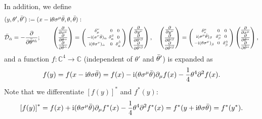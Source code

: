 \documentclass[CheatSheet]{subfiles}
\begin{document}
In addition, we define
\begin{align}
 & (y,\theta',\btheta'):=(x-\ii\theta\sigma^\mu\btheta,\theta,\btheta):
 \\&
\bar{\mathcal D}_\dalpha = -\pdiff{}{\btheta^{\prime\dalpha}};\qquad
 \left(\begin{matrix}\pdiff{}{x^\mu}\\\pdiff{}{\theta^\alpha}\\\pdiff{}{\btheta^\dalpha}\end{matrix}\right)
=\left(\begin{smallmatrix}\delta^\nu_\mu&0&0\\-\ii(\sigma^\nu\btheta)_\alpha&\delta^\beta_\alpha&0\\\ii(\theta\sigma^\nu)_\dalpha&0&\delta^\dbeta_\dalpha
       \end{smallmatrix}\right)
 \left(\begin{matrix}\pdiff{}{y^\nu}\\\pdiff{}{\theta^{\prime\beta}}\\\pdiff{}{\btheta^{\prime\dbeta}}\end{matrix}\right),\quad
 \left(\begin{matrix}\pdiff{}{y^\nu}\\\pdiff{}{\theta^{\prime\beta}}\\\pdiff{}{\btheta^{\prime\dbeta}}\end{matrix}\right)
=\left(\begin{smallmatrix}\delta^\mu_\nu&0&0\\\ii(\sigma^\mu\btheta)_\beta&\delta_\beta^\alpha&0\\-\ii(\theta\sigma^\mu)_\dbeta&0&\delta_\dbeta^\dalpha
       \end{smallmatrix}\right)
 \left(\begin{matrix}\pdiff{}{x^\mu}\\\pdiff{}{\theta^\alpha}\\\pdiff{}{\btheta^\dalpha}\end{matrix}\right),
\end{align}
and a function $f:\mathbb C^4\to \mathbb C$ (independent of $\theta'$ and $\bar\theta'$) is expanded as
\begin{equation}
  f(y)
= f(x-{\mathrm{i}}\theta\sigma\bar\theta)
=f(x)-{\mathrm{i}} (\theta \sigma^{\mu}\bar\theta) \partial_{\mu}f(x)-\frac{1}{4} \theta^4 \partial^2f(x).
\end{equation}
Note that we differentiate $[f(y)]^*$ and $f^*(y)$:
\begin{equation}
 \left[f(y)\right]^* =
f(x)+{\mathrm{i}} (\theta \sigma^{\mu}\bar\theta) \partial_{\mu}f^*(x)-\frac{1}{4} \theta^4 \partial^2f^*(x)
=f^*(y+{\mathrm{i}}\theta\sigma\bar\theta)=f^*(y^*).
\end{equation}
\end{document}
